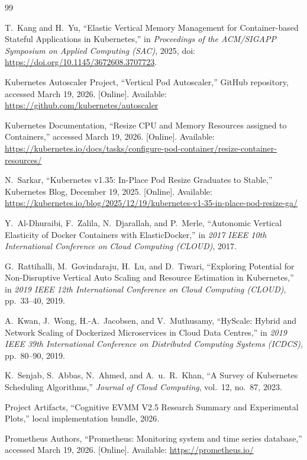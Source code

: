 \documentclass[12pt,a4paper]{article}
\begin{document}
\begin{thebibliography}{99}

T.~Kang and H.~Yu, ``Elastic Vertical Memory Management for Container-based Stateful Applications in Kubernetes,'' in \emph{Proceedings of the ACM/SIGAPP Symposium on Applied Computing (SAC)}, 2025, doi: \url{https://doi.org/10.1145/3672608.3707723}.

Kubernetes Autoscaler Project, ``Vertical Pod Autoscaler,'' GitHub repository, accessed March 19, 2026. [Online]. Available: \url{https://github.com/kubernetes/autoscaler}

Kubernetes Documentation, ``Resize CPU and Memory Resources assigned to Containers,'' accessed March 19, 2026. [Online]. Available: \url{https://kubernetes.io/docs/tasks/configure-pod-container/resize-container-resources/}

N.~Sarkar, ``Kubernetes v1.35: In-Place Pod Resize Graduates to Stable,'' Kubernetes Blog, December 19, 2025. [Online]. Available: \url{https://kubernetes.io/blog/2025/12/19/kubernetes-v1-35-in-place-pod-resize-ga/}

Y.~Al-Dhuraibi, F.~Zalila, N.~Djarallah, and P.~Merle, ``Autonomic Vertical Elasticity of Docker Containers with ElasticDocker,'' in \emph{2017 IEEE 10th International Conference on Cloud Computing (CLOUD)}, 2017.

G.~Rattihalli, M.~Govindaraju, H.~Lu, and D.~Tiwari, ``Exploring Potential for Non-Disruptive Vertical Auto Scaling and Resource Estimation in Kubernetes,'' in \emph{2019 IEEE 12th International Conference on Cloud Computing (CLOUD)}, pp.~33--40, 2019.

A.~Kwan, J.~Wong, H.-A.~Jacobsen, and V.~Muthusamy, ``HyScale: Hybrid and Network Scaling of Dockerized Microservices in Cloud Data Centres,'' in \emph{2019 IEEE 39th International Conference on Distributed Computing Systems (ICDCS)}, pp.~80--90, 2019.

K.~Senjab, S.~Abbas, N.~Ahmed, and A.~u.~R.~Khan, ``A Survey of Kubernetes Scheduling Algorithms,'' \emph{Journal of Cloud Computing}, vol.~12, no.~87, 2023.

Project Artifacts, ``Cognitive EVMM V2.5 Research Summary and Experimental Plots,'' local implementation bundle, 2026.

Prometheus Authors, ``Prometheus: Monitoring system and time series database,'' accessed March 19, 2026. [Online]. Available: \url{https://prometheus.io/}

\end{thebibliography}
\end{document}
